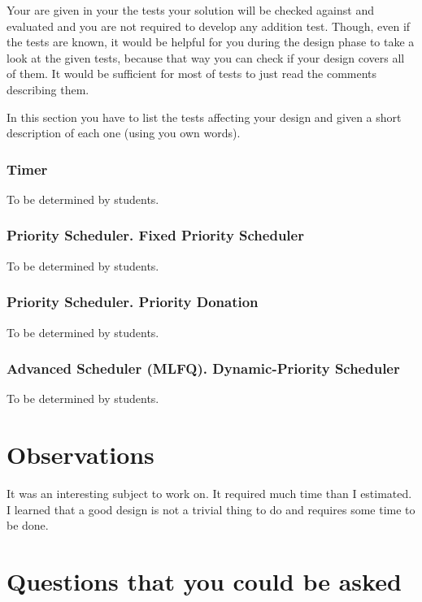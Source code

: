 Your are given in your \OSName{} the tests your solution will be checked against and evaluated and you are not required to develop any addition test. Though, even if the tests are known, it would be helpful for you during the design phase to take a look at the given tests, because that way you can check if your design covers all of them. It would be sufficient for most of tests to just read the comments describing them.

In this section you have to list the tests affecting your design and given a short description of each one (using you own words).

\subsubsection{Timer}

To be determined by students.

\subsubsection{Priority Scheduler. Fixed Priority Scheduler}

To be determined by students.

\subsubsection{Priority Scheduler. Priority Donation}

To be determined by students.

\subsubsection{Advanced Scheduler (MLFQ). Dynamic-Priority Scheduler}

To be determined by students.

\section{Observations}

It was an interesting subject to work on. It required much time than I estimated. I learned that a good design is not a trivial thing to do and requires some time to be done.  


\section{Questions that you could be asked}

